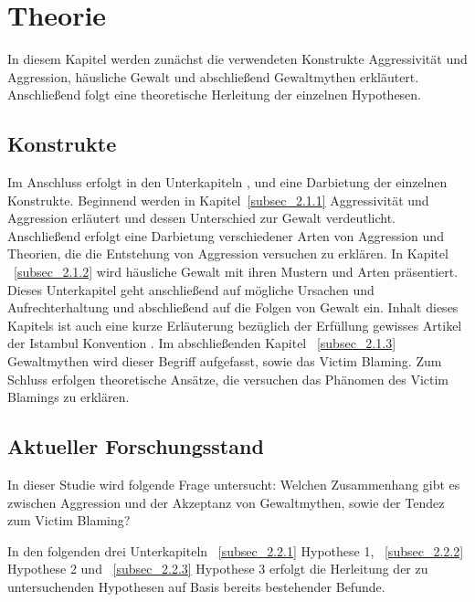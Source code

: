 

\chapter{Theorie}   \label{ch_2}
In diesem Kapitel werden zunächst die verwendeten Konstrukte Aggressivität und Aggression, häusliche Gewalt und abschließend Gewaltmythen erkläutert. Anschließend folgt eine theoretische Herleitung der einzelnen Hypothesen.

\section{Konstrukte}    \label{sec_2.1}
Im Anschluss erfolgt in den Unterkapiteln ,  und  eine Darbietung der einzelnen Konstrukte. Beginnend werden in Kapitel~\ref{subsec_2.1.1} Aggressivität und Aggression erläutert und dessen Unterschied zur Gewalt verdeutlicht. Anschließend erfolgt eine Darbietung verschiedener Arten von Aggression und Theorien, die die Entstehung von Aggression versuchen zu erklären. In Kapitel ~\ref{subsec_2.1.2} wird häusliche Gewalt mit ihren Mustern und Arten präsentiert. Dieses Unterkapitel geht anschließend auf mögliche Ursachen und Aufrechterhaltung und abschließend auf die Folgen von Gewalt ein. Inhalt dieses Kapitels ist auch eine kurze Erläuterung bezüglich der Erfüllung gewisses Artikel der Istambul Konvention \parencite{Istambul_Konvention}. Im abschließenden Kapitel ~\ref{subsec_2.1.3} Gewaltmythen wird dieser Begriff aufgefasst, sowie das Victim Blaming. Zum Schluss erfolgen theoretische Ansätze, die versuchen das Phänomen des Victim Blamings zu erklären.





\section{Aktueller Forschungsstand}   \label{sec_2.2}
In dieser Studie wird folgende Frage untersucht: Welchen Zusammenhang gibt es zwischen Aggression und der Akzeptanz von Gewaltmythen, sowie der Tendez zum Victim Blaming? 

In den folgenden drei Unterkapiteln ~\ref{subsec_2.2.1} Hypothese 1, ~\ref{subsec_2.2.2} Hypothese 2 und ~\ref{subsec_2.2.3} Hypothese 3 erfolgt die Herleitung der zu untersuchenden Hypothesen auf Basis bereits bestehender Befunde.




